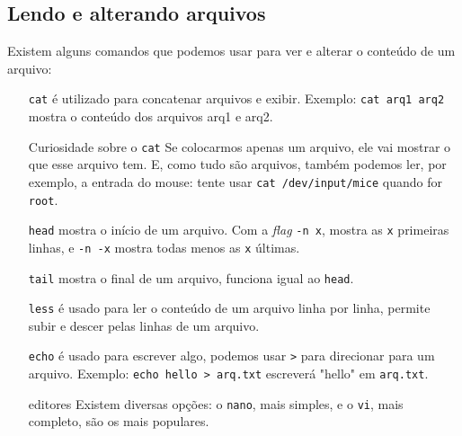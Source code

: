 \documentclass{beamer}
\begin{document}
\subsection{Lendo e alterando arquivos}

\begin{frame}

	Existem alguns comandos que podemos usar para ver e alterar o conteúdo de um arquivo:

	\begin{itemize}
		\item[\texttt{cat}] é utilizado para concatenar arquivos e exibir.
			\newline
			Exemplo: \texttt{cat arq1 arq2} mostra o conteúdo dos arquivos arq1 e arq2.
			\newline
			\begin{block}{Curiosidade sobre o \texttt{cat}}
				Se colocarmos apenas um arquivo, ele vai mostrar o que esse arquivo tem.
				E, como tudo são arquivos, também podemos ler, por exemplo, a entrada do
				mouse: tente usar \texttt{cat /dev/input/mice} quando for \texttt{root}.
			\end{block}
	\end{itemize}

\end{frame}

\begin{frame}

	\begin{itemize}
		\item[\texttt{head}] mostra o início de um arquivo. Com a \textit{flag}
			\texttt{-n x}, mostra as \texttt{x} primeiras linhas, e \texttt{-n -x}
			mostra todas menos as \texttt{x} últimas.
		\item[\texttt{tail}] mostra o final de um arquivo, funciona igual ao
			\texttt{head}.
		\item[\texttt{less}] é usado para ler o conteúdo de um arquivo linha por
			linha, permite subir e descer	pelas linhas de um arquivo.
		\item[\texttt{echo}] é usado para escrever algo, podemos usar \texttt{>}
			para direcionar para um arquivo.
			\newline
			Exemplo: \texttt{echo hello > arq.txt} escreverá "hello" em \texttt{arq.txt}.
		\item[editores] Existem diversas opções: o \texttt{nano}, mais simples, e
			o \texttt{vi}, mais completo, são os mais	populares.
	\end{itemize}
\end{frame}
\end{document}
